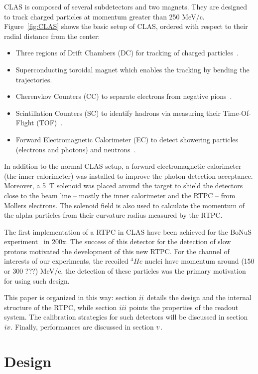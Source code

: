 \documentclass[reprint, amsmath,amssymb, aps]{revtex4}
\newcommand{\RNum}[1]{\uppercase\expandafter{\romannumeral #1\relax}}
\begin{document}
CLAS is composed of several subdetectors and two magnets. They are designed to track charged particles at momentum greater than 250 MeV/c. Figure~\ref{fig:CLAS} shows the basic setup of CLAS, ordered with respect to their radial distance from the center:

\begin{itemize}
\item Three regions of Drift Chambers (DC) for tracking of charged particles~\cite{DCref}.
\item Superconducting toroidal magnet which enables the tracking by bending the trajectories.
\item Cherenvkov Counters (CC) to separate electrons from negative pions~\cite{CCref}.
\item Scintillation Counters (SC) to identify hadrons via measuring their Time-Of-Flight (TOF)~\cite{TOFref}.
\item Forward Electromagnetic Calorimeter (EC) to detect showering particles (electrons and photons) and neutrons~\cite{ECref}.
\end{itemize}

In addition to the normal CLAS setup, a forward electromagnetic calorimeter (the inner calorimeter) was installed to improve the photon detection acceptance. Moreover, a 5~T solenoid was placed around the target to shield the detectors close to the beam line -- mostly the inner calorimeter and the RTPC -- from Mollers electrons. The solenoid field is also used to calculate the momentum of the alpha particles from their curvature radius measured by the RTPC.

The first implementation of a RTPC in CLAS have been achieved for the BoNuS experiment~\cite{BONUS} in 200x. The success of this detector for the detection of slow protons motivated the development of this new RTPC. For the channel of interests of our experiments, the recoiled $^{4}He$ nuclei have momentum around (150 or 300 ???) MeV/c, the detection of these particles was the primary motivation for using such design. 

This paper is organized in this way: section $\RNum{2}$ details the design and the internal structure of the RTPC, while section $\RNum{3}$ points the properties of the readout system. The calibration strategies for such detectors will be discussed in section $\RNum{4}$. Finally, performances are discussed in section $\RNum{5}$.

 
\section{Design}
\end{document}
